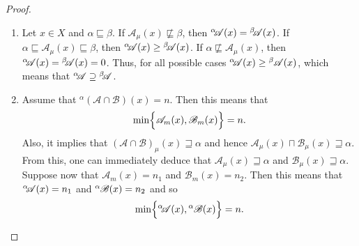 \documentclass{amsart}
\theoremstyle{definition}
\begin{document}
\begin{proof}
\begin{enumerate}
\item Let $x\in X$ and $\alpha\sqsubseteq\beta$. If 
$\mathscr{A}_{\mu}(x)\not\sqsubseteq\beta$, then 
${}^{\alpha}\kern-0.25em\mathscr{A}(x)={}^{\beta}\kern-0.25em\mathscr{A}(x)$. 
If $\alpha\sqsubseteq\mathscr{A}_{\mu}(x)\sqsubseteq\beta$, then
${}^{\alpha}\kern-0.25em\mathscr{A}(x)\ge{}^{\beta}\kern-0.25em\mathscr{A}(x)$.
If $\alpha\not\sqsubseteq\mathscr{A}_{\mu}(x)$, then 
${}^{\alpha}\kern-0.25em\mathscr{A}(x)={}^{\beta}\kern-0.25em\mathscr{A}(x)=
0$. Thus, for all possible cases  ${}^{\alpha}\kern-0.25em\mathscr{A}(x)\ge
{}^{\beta}\kern-0.05em\mathscr{A}(x)$, which means that
${}^{\alpha}\kern-0.25em\mathscr{A}\supseteq{}^{\beta}\kern-0.25em\mathscr{A}$.
\item Assume that ${}^{\alpha}(\mathscr{A}\cap\mathscr{B})(x)=n$. Then
this means that
\begin{displaymath}
\min\Bigl\{\mathscr{A}_{m}(x),\mathscr{B}_{m}(x)\Bigr\}=n.
\end{displaymath}
Also, it implies that 
$(\mathscr{A}\cap\mathscr{B})_{\mu}(x)\sqsupseteq\alpha$ and hence
$\mathscr{A}_{\mu}(x)\sqcap\mathscr{B}_{\mu}(x)\sqsupseteq\alpha$. From this,
one can immediately deduce that $\mathscr{A}_{\mu}(x)\sqsupseteq\alpha$ and 
$\mathscr{B}_{\mu}(x)\sqsupseteq\alpha$. Suppose now that 
$\mathscr{A}_{m}(x)=n_{1}$ and $\mathscr{B}_{m}(x)=n_{2}$. Then this means
that ${}^{\alpha}\kern-0.25em\mathscr{A}(x)=n_{1}$ and
${}^{\alpha}\kern-0.05em\mathscr{B}(x)=n_{2}$ and so
\begin{displaymath}
\min\Bigl\{{}^{\alpha}\kern-0.25em\mathscr{A}(x),
{}^{\alpha}\kern-0.05em\mathscr{B}(x)\Bigr\}=n.
\end{displaymath}
\end{enumerate}
\end{proof}
\end{document}
